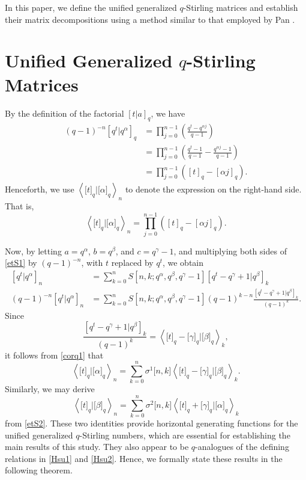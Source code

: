 \documentclass[12pt]{article}
\begin{document}
In this paper, we define the unified generalized $q$-Stirling matrices and establish their matrix decompositions using a method similar to that employed by Pan \cite{Pan}.

\section{Unified Generalized $q$-Stirling Matrices}

By the definition of the factorial $\left[t|a\right]_q$, we have
\begin{align*}
	(q-1)^{-n}[q^t|q^{\alpha}]_q&=\prod_{j=0}^{n-1}\left(\frac{q^t-q^{\alpha j}}{q-1}\right)\\
	&=\prod_{j=0}^{n-1}\left(\frac{q^t-1}{q-1}-\frac{q^{\alpha j}-1}{q-1}\right)\\
	&=\prod_{j=0}^{n-1}\left([t]_q-[\alpha j]_q\right).
\end{align*}
Henceforth, we use $\left\langle \big[t\big]_q|\big[\alpha\big]_q\right\rangle_n$ to denote the expression on the right-hand side. That is,
\begin{equation}
	\left\langle \big[t\big]_q|\big[\alpha\big]_q\right\rangle_n=\prod_{j=0}^{n-1}\left([t]_q-[\alpha j]_q\right).
\end{equation}

Now, by letting $a=q^{\alpha}$, $b=q^{\beta}$, and $c=q^{\gamma}-1$, and multiplying both sides of \eqref{etS1} by $(q-1)^{-n}$, with $t$ replaced by $q^{t}$, we obtain
\begin{align*}
	\left[q^t|q^{\alpha}\right]_n&=\sum_{k=0}^{n}S[n,k;q^{\alpha},q^{\beta},q^{\gamma}-1]\left[q^t-q^{\gamma}+1|q^{\beta}\right]_k\\
	(q-1)^{-n}\left[q^t|q^{\alpha}\right]_n&=\sum_{k=0}^{n}S[n,k;q^{\alpha},q^{\beta},q^{\gamma}-1](q-1)^{k-n}\frac{\left[q^t-q^{\gamma}+1|q^{\beta}\right]_k}{(q-1)^k}.
\end{align*}
Since
\begin{equation}
	\frac{\left[q^t-q^{\gamma}+1|q^{\beta}\right]_k}{(q-1)^k}=\left\langle\big[t\big]_q-\big[\gamma\big]_q|\big[\beta\big]_q\right\rangle_k,
\end{equation}
it follows from \eqref{corq1} that
\begin{equation*}
	\left\langle\big[t\big]_q|\big[\alpha\big]_q\right\rangle_n=\sum_{k=0}^{n}\sigma^1\big[n,k\big]\left\langle\big[t\big]_q-\big[\gamma\big]_q|\big[\beta\big]_q\right\rangle_k.
\end{equation*}
Similarly, we may derive
\begin{equation*}
	\left\langle\big[t\big]_q|\big[\beta\big]_q\right\rangle_n=\sum_{k=0}^{n}\sigma^2\big[n,k\big]\left\langle\big[t\big]_q+\big[\gamma\big]_q|\big[\alpha\big]_q\right\rangle_k
\end{equation*}
from \eqref{etS2}. These two identities provide horizontal generating functions for the unified generalized $q$-Stirling numbers, which are essential for establishing the main results of this study. They also appear to be $q$-analogues of the defining relations in \eqref{Hsu1} and \eqref{Hsu2}. Hence, we formally state these results in the following theorem.
\end{document}
